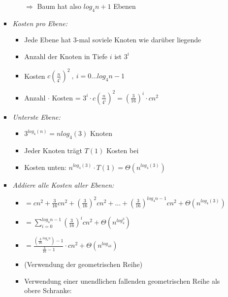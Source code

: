 \begin{itemize}
\begin{itemize}
\begin{itemize}
\begin{itemize}
                                    $\Rightarrow$ Baum hat also $log_4n + 1$ Ebenen
                            \end{itemize}
                        \item \textit{Kosten pro Ebene:}
                            \begin{itemize}
                                \item Jede Ebene hat 3-mal soviele Knoten wie darüber liegende
                                \item Anzahl der Knoten in Tiefe $i$ ist $3^i$
                                \item Kosten $c(\frac{n}{4^i})^2~,~i=0...log_4n-1$
                                \item Anzahl $\cdot$ Kosten = $3^i \cdot c(\frac{n}{4^i})^2 = (\frac{3}{16})^i \cdot cn^2$
                            \end{itemize}
                        \item \textit{Unterste Ebene:}
                            \begin{itemize}
                                \item $3^{log_4(n)} = n  {log_4(3)}$ Knoten
                                \item Jeder Knoten trägt $T(1)$ Kosten bei 
                                \item Kosten unten: $n^{log_4(3)} \cdot T(1) = \Theta(n^{log_4(3)})$
                            \end{itemize}
                        \item \textit{Addiere alle Kosten aller Ebenen:}
                            \begin{itemize}
                                \item {} $= cn^2 + \frac{3}{16}cn^2 + (\frac{3}{16})^2cn^2+...+ (\frac{3}{16})^{log_4n-1}cn^2 + \Theta(n^{log_4(3)})$
                                \item[] {\makebox[0.75cm][l]{}} $= \sum^{log_4n-1}_{i=0} (\frac{3}{16})^icn^2+ \Theta(n^{log_4^3})$
                                \item[] {\makebox[0.75cm][l]{}} $= \frac{(\frac{3}{16}^{log_4n})-1}{\frac{3}{16}-1} \cdot cn^2 + \Theta(n^{log_43})$ 
                                \item[] {\small (Verwendung der geometrischen Reihe)}
                                \item Verwendung einer unendlichen fallenden geometrischen Reihe als obere Schranke:

\end{itemize}
\end{itemize}
\end{itemize}
\end{itemize}
